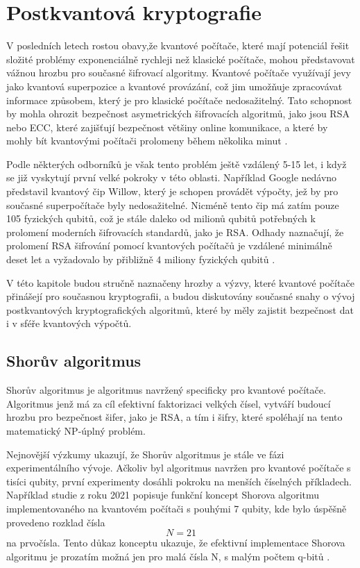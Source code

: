 \section{Postkvantová kryptografie}
\label{sec:postkvantova-kryptografie}
V posledních letech rostou obavy,že kvantové počítače, které mají potenciál řešit složité problémy exponenciálně rychleji než klasické počítače, mohou představovat vážnou hrozbu pro současné šifrovací algoritmy. Kvantové počítače využívají jevy jako kvantová superpozice a kvantové provázání, což jim umožňuje zpracovávat informace způsobem, který je pro klasické počítače nedosažitelný. Tato schopnost by mohla ohrozit bezpečnost asymetrických šifrovacích algoritmů, jako jsou RSA nebo ECC, které zajišťují bezpečnost většiny online komunikace, a které by mohly bít kvantovými počítači prolomeny během několika minut \parencite{qubits2024}.

Podle některých odborníků je však tento problém ještě vzdálený 5-15 let, i když se již vyskytují první velké pokroky v této oblasti. Například Google nedávno představil kvantový čip Willow, který je schopen provádět výpočty, jež by pro současné superpočítače byly nedosažitelné. Nicméně tento čip má zatím pouze 105 fyzických qubitů, což je stále daleko od milionů qubitů potřebných k prolomení moderních šifrovacích standardů, jako je RSA. Odhady naznačují, že prolomení RSA šifrování pomocí kvantových počítačů je vzdálené minimálně deset let a vyžadovalo by přibližně 4 miliony fyzických qubitů \parencite{qubits2024}.

V této kapitole budou stručně naznačeny hrozby a výzvy, které kvantové počítače přinášejí pro současnou kryptografii, a budou diskutovány současné snahy o vývoj postkvantových kryptografických algoritmů, které by měly zajistit bezpečnost dat i v sféře kvantových výpočtů.

\subsection{Shorův algoritmus}
Shorův algoritmus je algoritmus navržený specificky pro kvantové počítače. Algoritmus jenž má za cíl efektivní faktorizaci velkých čísel, vytváří budoucí hrozbu pro bezpečnost šifer, jako je RSA, a tím i šifry, které spoléhají na tento matematický NP-úplný problém.

Nejnovější výzkumy ukazují, že Shorův algoritmus je stále ve fázi experimentálního vývoje. Ačkoliv byl algoritmus navržen pro kvantové počítače s tisíci qubity, první experimenty dosáhli pokroku na menších číselných příkladech. Například studie z roku 2021 popisuje funkční koncept Shorova algoritmu implementovaného na kvantovém počítači s pouhými 7 qubity, kde bylo úspěšně provedeno rozklad čísla \[N = 21\] na prvočísla. Tento důkaz konceptu ukazuje, že efektivní implementace Shorova algoritmu je prozatím možná jen pro malá čísla N, s malým počtem q-bitů \parencite{skosana2021}.

